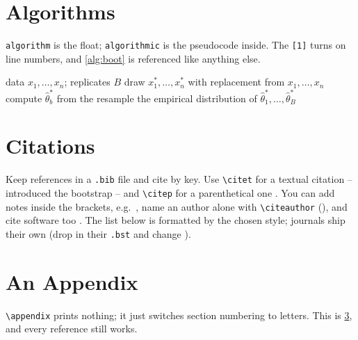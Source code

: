 \documentclass[11pt]{article}
\begin{document}
\section{Algorithms}\label{sec:alg}

\texttt{algorithm} is the float; \texttt{algorithmic} is the pseudocode inside.
The \texttt{[1]} turns on line numbers, and \cref{alg:boot} is referenced like
anything else.

\begin{algorithm}[ht!]
  \caption{Nonparametric bootstrap \citep{efron1979bootstrap}}
  \label{alg:boot}
  \begin{algorithmic}[1]
    \Require data $x_1,\ldots,x_n$; replicates $B$
      \State draw $x_1^*,\ldots,x_n^*$ with replacement from $x_1,\ldots,x_n$
      \State compute $\hat{\theta}^*_b$ from the resample
    \EndFor
    \State \Return the empirical distribution of $\hat{\theta}^*_1,\ldots,\hat{\theta}^*_B$
  \end{algorithmic}
\end{algorithm}

\section{Citations}\label{sec:cites}

Keep references in a \texttt{.bib} file and cite by key.
Use \verb|\citet| for a textual citation -- \citet{efron1979bootstrap} introduced
the bootstrap -- and \verb|\citep| for a parenthetical one
\citep{tibshirani1996regression}.
You can add notes inside the brackets, e.g.\ \citep[see][Ch.~7]{casella2002statistical},
name an author alone with \verb|\citeauthor| (\citeauthor{tibshirani1996regression}),
and cite software too \citep{wickham2016ggplot2}.
The list below is formatted by the chosen style; journals ship their own (drop in
their \texttt{.bst} and change \verb||).

\appendix
\section{An Appendix}\label{app:extra}

\verb|\appendix| prints nothing; it just switches section numbering to letters.
This is \cref{app:extra}, and every reference still works.



\end{document}
